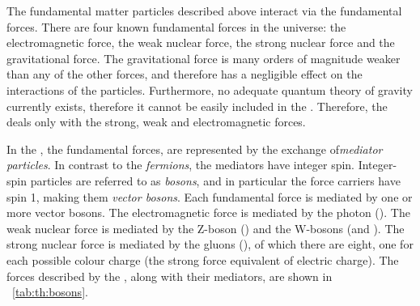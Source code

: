 The fundamental matter particles described above interact via the fundamental forces. There are four known fundamental forces in the universe: the electromagnetic force, the weak nuclear force, the strong nuclear force and the gravitational force. The gravitational force is many orders of magnitude weaker than any of the other forces, and therefore has a negligible effect on the interactions of the \SM particles. Furthermore, no adequate quantum theory of gravity currently exists, therefore it cannot be easily included in the \SM. Therefore, the \SM deals only with the strong, weak and electromagnetic forces.

In the \SM, the fundamental forces, are represented by the exchange of\emph{mediator particles}. In contrast to the \emph{fermions}, the mediators have integer spin. Integer-spin particles are referred to as \emph{bosons}, and in particular the force carriers have spin 1, making them \emph{vector bosons}. 
Each fundamental force is mediated by one or more vector bosons. The electromagnetic force is mediated by the photon (\Pphoton). The weak nuclear force is mediated by the Z-boson (\PZ) and the W-bosons (\PWplus and \PWminus). The strong nuclear force is mediated by the gluons (\Pgluon), of which there are eight, one for each possible colour charge (the strong force equivalent of electric charge).
The forces described by the \SM, along with their mediators, are shown in \Tab~\ref{tab:th:bosons}.

\begin{table}[h!]
 \caption{The three fundamental forces considered by the \SM are presented. For each force, the approximate strength relative to the strong force is shown, assuming two fundamental particles separated by a distance of $10^{-15}\m$. The mediator particle of each force is indicated along with its measured mass.\cite{Thomson:2013zua}}
\label{tab:th:bosons}
  \end{table}

